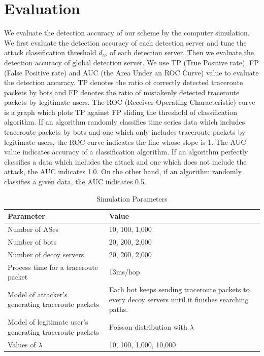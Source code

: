 \documentclass[conference]{IEEEtran}
\begin{document}
  \section{Evaluation}\label{Sec:Evaluation}
    We evaluate the detection accuracy of our scheme by the computer simulation.
    We first evaluate the detection accuracy of each detection server and tune the attack classification threshold $d_{th}$ of each detection server.
    Then we evaluate the detection accuracy of global detection server.
    We use TP (True Positive rate), FP (False Positive rate) and AUC (the Area Under an ROC Curve) value to evaluate the detection accuracy.
    TP denotes the ratio of correctly detected traceroute packets by bots and FP denotes the ratio of mistakenly detected traceroute packets by legitimate users.
    The ROC (Receiver Operating Characteristic) curve is a graph which plots TP against FP sliding the threshold of classification algorithm.
    If an algorithm randomly classifies time series data which includes traceroute packets by bots and one which only includes traceroute packets by legitimate users, the ROC curve indicates the line whose slope is 1.
    The AUC value indicates accuracy of a classification algorithm.
    If an algorithm perfectly classifies a data which includes the attack and one which does not include the attack, the AUC indicates 1.0.
    On the other hand, if an algorithm randomly classifies a given data, the AUC indicates 0.5.
    \begin{table}[!t]
      \renewcommand{\arraystretch}{1.3}
      \caption{Simulation Parameters}
      \label{Tab:Simulation Parameters}
      \centering
      \begin{tabular}{p{1.7in} p{1.7in}}
        \hline\hline
        Parameter & Value\\
        \hline
        Number of ASes & 10, 100, 1,000\\
        Number of bots & 20, 200, 2,000\\
        Number of decoy servers & 20, 200, 2,000\\
        Process time for a traceroute packet & 13ms/hop\\
        Model of attacker's generating traceroute packets & Each bot keeps sending traceroute packets to every decoy servers until it finishes searching paths.\\
        Model of legitimate user's generating traceroute packets & Poisson distribution with $\lambda$\\
        Values of $\lambda$ & 10, 100, 1,000, 10,000\\
        \hline\hline
      \end{tabular}
    \end{table}
\end{document}
